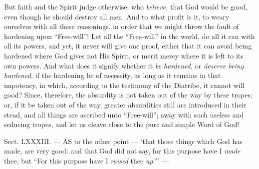 But faith and the Spirit judge otherwise; who \emph{believe, }that God would be good, even though he should destroy all men. And to what profit is it, to weary ourselves with all these reasonings, in order that we might throw the fault of hardening upon “Free-will”! Let all the “Free-will” in the world, do all it can with all its powers, and yet, it never will give one proof, either that it can avoid being hardened where God gives not His Spirit, or merit mercy where it is left to its own powers. And what does it signify whether it \emph{be hardened, }or \emph{deserve being hardened, }if the hardening be of necessity, as long as it remains in that impotency, in which, according to the testimony of the Diatribe, it cannot will good? Since, therefore, the absurdity is not taken out of the way by these tropes; or, if it be taken out of the way, greater absurdities still are introduced in their stead, and all things are ascribed unto “Free-will”; away with such useless and seducing tropes, and let us cleave close to the pure and simple Word of God!


Sect. LXXXIII. — AS to the other point — ‘that those things which God has made, are very good: and that God did not say, for this purpose have I \emph{made }thee, but “For this purpose have I \emph{raised }thee \emph{up}.”’ —

